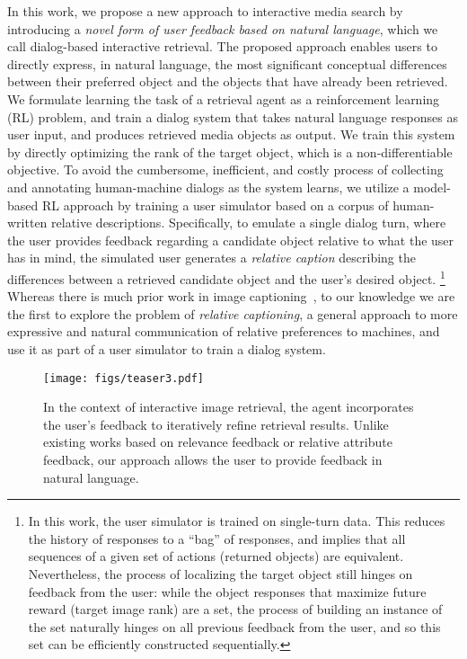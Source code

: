 In this work, we propose a new approach to interactive media search by introducing a {\em novel form of user feedback based on natural language}, which we call dialog-based interactive retrieval.
The proposed approach enables users to directly express, in natural language, the most significant conceptual differences between their preferred object and the objects that have already been retrieved. 
We formulate learning the task of a retrieval agent as a reinforcement learning (RL) problem, and train
a dialog system that takes natural language responses as user input, and produces retrieved media objects as output. We train this system by directly optimizing the rank of the target object, which is a non-differentiable objective.
To avoid the cumbersome, inefficient, and costly process of collecting and annotating human-machine dialogs as the system learns, we utilize a model-based RL approach by training a user simulator based on a corpus of human-written relative descriptions. 
Specifically, to emulate a single dialog turn, where the user provides feedback regarding a candidate object relative to what the user has in mind, the simulated user generates a {\em relative caption} describing the differences between a retrieved candidate object and the user's desired object. 
\footnote{In this work, the user simulator is trained on single-turn data. This reduces the history of responses to a ``bag'' of responses, and implies that all sequences of a given set of actions (returned objects) are equivalent. Nevertheless, the process of localizing the target object still hinges on feedback from the user: while the object responses that maximize future reward (target image rank) are a set, the process of building an instance of the set naturally hinges on all previous feedback from the user, and so this set can be efficiently constructed sequentially.}
Whereas there is much prior work in image
captioning~\cite{kulkarni2011baby,vinyals2015show,rennie2016self}, to our knowledge we are the first to explore the problem of {\em relative %
captioning}, a general approach to more expressive and natural communication of relative preferences to machines, and use it as part of a user simulator to train a dialog system.
 
\begin{figure}[t]
\begin{center}
\texttt{[image: figs/teaser3.pdf]}
\end{center}
\caption{In the context of interactive image retrieval, the agent incorporates the user's 
feedback to iteratively refine retrieval results. Unlike existing works based on relevance feedback or relative attribute feedback, our approach 
allows the user to provide feedback in natural language. 
\vspace{-0.05em}
}
\label{fig:teaser}
\end{figure}

